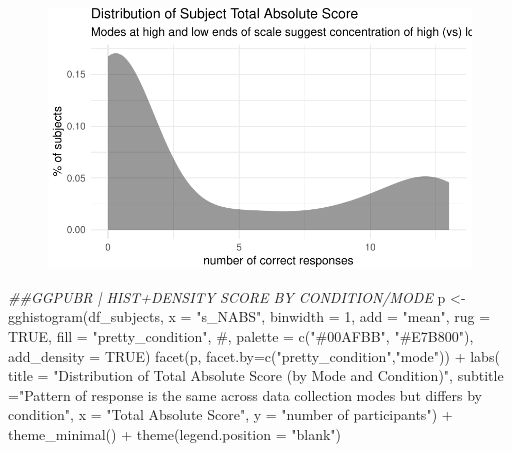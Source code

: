 \documentclass[
  letterpaper,
  DIV=11,
  numbers=noendperiod]{scrreprt}
\newenvironment{Shaded}{\begin{snugshade}}{\end{snugshade}}
\newcommand{\AttributeTok}[1]{\textcolor[rgb]{0.40,0.45,0.13}{#1}}
\newcommand{\CommentTok}[1]{\textcolor[rgb]{0.37,0.37,0.37}{#1}}
\newcommand{\ConstantTok}[1]{\textcolor[rgb]{0.56,0.35,0.01}{#1}}
\newcommand{\DecValTok}[1]{\textcolor[rgb]{0.68,0.00,0.00}{#1}}
\newcommand{\DocumentationTok}[1]{\textcolor[rgb]{0.37,0.37,0.37}{\textit{#1}}}
\newcommand{\FunctionTok}[1]{\textcolor[rgb]{0.28,0.35,0.67}{#1}}
\newcommand{\NormalTok}[1]{\textcolor[rgb]{0.00,0.23,0.31}{#1}}
\newcommand{\OtherTok}[1]{\textcolor[rgb]{0.00,0.23,0.31}{#1}}
\newcommand{\SpecialCharTok}[1]{\textcolor[rgb]{0.37,0.37,0.37}{#1}}
\newcommand{\StringTok}[1]{\textcolor[rgb]{0.13,0.47,0.30}{#1}}
\begin{document}
\begin{figure}[H]

{\centering \includegraphics{analysis/SGC3A/3_sgc3A_description_files/figure-pdf/VIS-SUBJ-ABS-1.pdf}

}

\end{figure}

\begin{Shaded}
\begin{Highlighting}[]
\DocumentationTok{\#\#GGPUBR | HIST+DENSITY SCORE BY CONDITION/MODE}
\NormalTok{p }\OtherTok{\textless{}{-}} \FunctionTok{gghistogram}\NormalTok{(df\_subjects, }\AttributeTok{x =} \StringTok{"s\_NABS"}\NormalTok{, }\AttributeTok{binwidth =} \DecValTok{1}\NormalTok{,}
   \AttributeTok{add =} \StringTok{"mean"}\NormalTok{, }\AttributeTok{rug =} \ConstantTok{TRUE}\NormalTok{,}
   \AttributeTok{fill =} \StringTok{"pretty\_condition"}\NormalTok{, }\CommentTok{\#, palette = c("\#00AFBB", "\#E7B800"),}
   \AttributeTok{add\_density =} \ConstantTok{TRUE}\NormalTok{) }
\FunctionTok{facet}\NormalTok{(p, }\AttributeTok{facet.by=}\FunctionTok{c}\NormalTok{(}\StringTok{"pretty\_condition"}\NormalTok{,}\StringTok{"mode"}\NormalTok{)) }\SpecialCharTok{+} 
  \FunctionTok{labs}\NormalTok{( }\AttributeTok{title =} \StringTok{"Distribution of Total Absolute Score (by Mode and Condition)"}\NormalTok{,}
        \AttributeTok{subtitle =}\StringTok{"Pattern of response is the same across data collection modes but differs by condition"}\NormalTok{,}
        \AttributeTok{x =} \StringTok{"Total Absolute Score"}\NormalTok{, }\AttributeTok{y =} \StringTok{"number of participants"}\NormalTok{) }\SpecialCharTok{+} 
  \FunctionTok{theme\_minimal}\NormalTok{() }\SpecialCharTok{+} \FunctionTok{theme}\NormalTok{(}\AttributeTok{legend.position =} \StringTok{"blank"}\NormalTok{) }
\end{Highlighting}
\end{Shaded}
\end{document}
